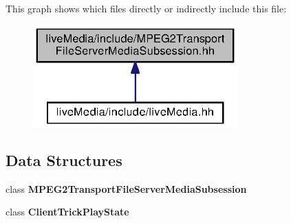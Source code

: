 This graph shows which files directly or indirectly include this file\+:
\nopagebreak
\begin{figure}[H]
\begin{center}
\leavevmode
\includegraphics[width=223pt]{MPEG2TransportFileServerMediaSubsession_8hh__dep__incl}
\end{center}
\end{figure}
\subsection*{Data Structures}
\begin{DoxyCompactItemize}
\item 
class {\bf M\+P\+E\+G2\+Transport\+File\+Server\+Media\+Subsession}
\item 
class {\bf Client\+Trick\+Play\+State}
\end{DoxyCompactItemize}

